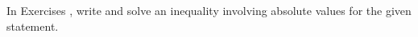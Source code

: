 {\noindent In Exercises}
{, write and solve an inequality involving absolute values for the given statement.}
